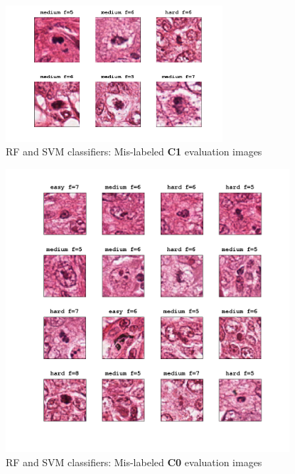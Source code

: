 \begin{figure}[!hb]
 \centering
  \includegraphics[width=0.72\textwidth]{./images/dataset/classFN.png}
  \caption{RF and SVM classifiers: Mis-labeled \textbf{C1} evaluation images}
  \label{appendixD:fig9}
\end{figure}

\clearpage

\begin{figure}[!ht]
 \centering
  \includegraphics[width=0.94\textwidth]{./images/dataset/classFP.png}
  \caption{RF and SVM classifiers: Mis-labeled \textbf{C0} evaluation images}
  \label{appendixD:fig10}
\end{figure}

